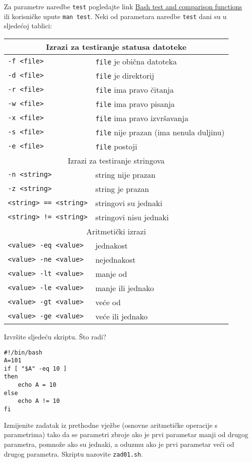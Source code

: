 Za parametre naredbe \texttt{test} pogledajte link \href{http://www.ibm.com/developerworks/library/l-bash-test/index.html}{Bash test and comparison functions} ili korisničke upute \texttt{man test}. Neki od parametara naredbe \texttt{test} dani su u 
sljedećoj tablici:\\
\begin{longtable}{ll}
  \hline
  \multicolumn{2}{c}{Izrazi za testiranje statusa datoteke} \\
  \hline
  \texttt{-f <file>} & \texttt{file} je obična datoteka \\
  \texttt{-d <file>} & \texttt{file} je direktorij \\
  \texttt{-r <file>} & \texttt{file} ima pravo čitanja \\
  \texttt{-w <file>} & \texttt{file} ima pravo pisanja \\
  \texttt{-x <file>} & \texttt{file} ima pravo izvršavanja \\
  \texttt{-s <file>} & \texttt{file} nije prazan (ima nenula duljinu) \\
  \texttt{-e <file>} & \texttt{file} postoji \\
  \hline
  \multicolumn{2}{c}{Izrazi za testiranje stringova} \\
  \hline
  \texttt{-n <string>} & string nije prazan \\
  \texttt{-z <string>} & string je prazan \\
  \texttt{<string> == <string>} & stringovi su jednaki \\
\texttt{<string> != <string>} & stringovi nisu jednaki \\
\hline
  \multicolumn{2}{c}{Aritmetički izrazi} \\
  \hline
  \texttt{<value> -eq <value>} & jednakost \\
  \texttt{<value> -ne <value>} & nejednakost \\
  \texttt{<value> -lt <value>} & manje od \\
  \texttt{<value> -le <value>} & manje ili jednako \\
  \texttt{<value> -gt <value>} & veće od \\
  \texttt{<value> -ge <value>} & veće ili jednako \\
\hline
\end{longtable}
\begin{primjer} 
Izvršite sljedeću skriptu. Što radi?
\begin{lstlisting}
#!/bin/bash
A=101
if [ "$A" -eq 10 ]
then
    echo A = 10
else
    echo A != 10
fi
\end{lstlisting}
\end{primjer}
\begin{zadatak} Izmijenite zadatak iz prethodne vježbe (osnovne aritmetičke operacije s parametrima) tako da se parametri zbroje ako je prvi parametar manji od drugog parametra, pomnože ako su jednaki, a oduzmu ako je prvi parametar veći od drugog parametra. Skriptu nazovite \texttt{zad01.sh}.
\end{zadatak}
